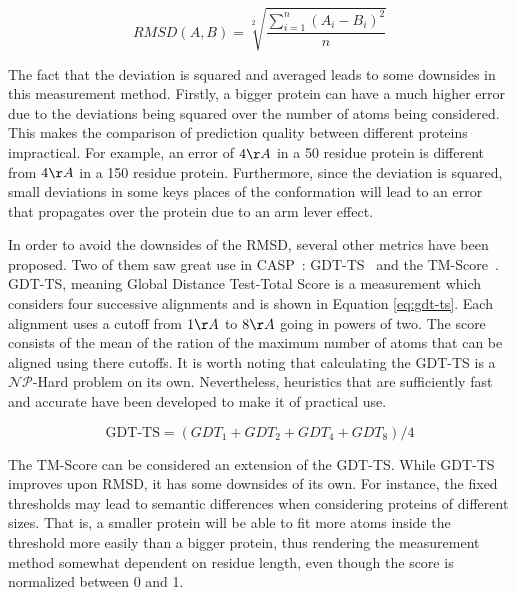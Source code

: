 
\begin{equation} RMSD (A, B) = \sqrt[2]{\frac{\sum^{n}_{i = 1}{(A_i -
B_i)^2}}{n}} \label{eq:rmsd} \end{equation}

The fact that the deviation is squared and averaged leads to some downsides in
this measurement method. Firstly, a bigger protein can have a much higher error
due to the deviations being squared over the number of atoms being considered.
This makes the comparison of prediction quality between different proteins
impractical. For example, an error of $4{\AA}$ in a 50 residue protein is
different from $4{\AA}$ in a 150 residue protein. Furthermore, since the
deviation is squared, small deviations in some keys places of the conformation
will lead to an error that propagates over the protein due to an arm lever
effect.

In order to avoid the downsides of the \ac{RMSD}, several other metrics have
been proposed. Two of them saw great use in \ac{CASP}~\cite{moult2018critical}:
\ac{GDT-TS}~\cite{zemla2003lga} and the \ac{TM-Score}~\cite{zhang2004scoring}.
\ac{GDT-TS}, meaning Global Distance Test-Total Score is a measurement which
considers four successive alignments and is shown in Equation \ref{eq:gdt-ts}.
Each alignment uses a cutoff from $1{\AA}$ to $8{\AA}$ going in powers of two.
The score consists of the mean of the ration of the maximum number of atoms
that can be aligned using there cutoffs. It is worth noting that calculating
the \ac{GDT-TS} is a $\mathcal{NP}$-Hard problem on its own. Nevertheless,
heuristics that are sufficiently fast and accurate have been developed to make
it of practical use.

\begin{equation} \text{GDT-TS} = ( GDT_1 + GDT_2 + GDT_4 + GDT_8 ) / 4
\label{eq:gdt-ts} \end{equation}

The \ac{TM-Score} can be considered an extension of the \ac{GDT-TS}. While
\ac{GDT-TS} improves upon \ac{RMSD}, it has some downsides of its own. For
instance, the fixed thresholds may lead to semantic differences when
considering proteins of different sizes. That is, a smaller protein will be
able to fit more atoms inside the threshold more easily than a bigger protein,
thus rendering the measurement method somewhat dependent on residue length,
even though the score is normalized between 0 and 1.

